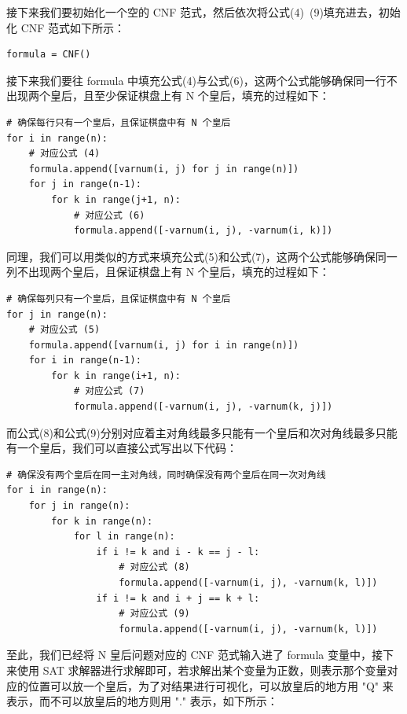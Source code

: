 \documentclass{article}
\begin{document}
接下来我们要初始化一个空的 CNF 范式，然后依次将公式(4)~(9)填充进去，初始化 CNF 范式如下所示：

\begin{lstlisting}
formula = CNF()
\end{lstlisting}

接下来我们要往 formula 中填充公式(4)与公式(6)，这两个公式能够确保同一行不出现两个皇后，且至少保证棋盘上有 N 个皇后，填充的过程如下：

\begin{lstlisting}
# 确保每行只有一个皇后，且保证棋盘中有 N 个皇后
for i in range(n):
    # 对应公式 (4)
    formula.append([varnum(i, j) for j in range(n)])
    for j in range(n-1):
        for k in range(j+1, n):
            # 对应公式 (6)
            formula.append([-varnum(i, j), -varnum(i, k)])
\end{lstlisting}

同理，我们可以用类似的方式来填充公式(5)和公式(7)，这两个公式能够确保同一列不出现两个皇后，且保证棋盘上有 N 个皇后，填充的过程如下：

\begin{lstlisting}
# 确保每列只有一个皇后，且保证棋盘中有 N 个皇后
for j in range(n):
    # 对应公式 (5)
    formula.append([varnum(i, j) for i in range(n)])
    for i in range(n-1):
        for k in range(i+1, n):
            # 对应公式 (7)
            formula.append([-varnum(i, j), -varnum(k, j)])
\end{lstlisting}

而公式(8)和公式(9)分别对应着主对角线最多只能有一个皇后和次对角线最多只能有一个皇后，我们可以直接公式写出以下代码：

\begin{lstlisting}
# 确保没有两个皇后在同一主对角线，同时确保没有两个皇后在同一次对角线
for i in range(n):
    for j in range(n):
        for k in range(n):
            for l in range(n):
                if i != k and i - k == j - l:
                    # 对应公式 (8)
                    formula.append([-varnum(i, j), -varnum(k, l)])
                if i != k and i + j == k + l:
                    # 对应公式 (9)
                    formula.append([-varnum(i, j), -varnum(k, l)])
\end{lstlisting}

至此，我们已经将 N 皇后问题对应的 CNF 范式输入进了 formula 变量中，接下来使用 SAT 求解器进行求解即可，若求解出某个变量为正数，则表示那个变量对应的位置可以放一个皇后，为了对结果进行可视化，可以放皇后的地方用 "Q" 来表示，而不可以放皇后的地方则用 "." 表示，如下所示：
\end{document}
